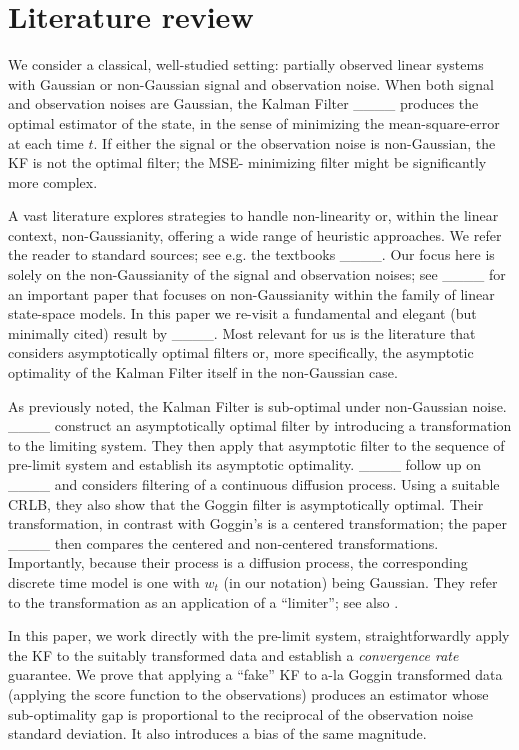 \section{Literature review\label{sec:lit}
} 

We consider a classical, well-studied setting: partially observed linear systems with Gaussian or non-Gaussian signal and observation noise. When both signal and observation noises are Gaussian, the Kalman Filter ____ produces the optimal estimator of the state, in the sense of minimizing the mean-square-error at each time $t$. 
If either the signal or the observation noise is non-Gaussian, the KF is not the optimal filter; the MSE- minimizing filter might be significantly more complex. 

A vast literature explores strategies to handle non-linearity or, within the linear context, non-Gaussianity, offering a wide range of heuristic approaches.
We refer the reader to standard sources; see e.g. the textbooks ____. 
Our focus here is solely on the non-Gaussianity of the signal and observation noises; see 
 ____ for an important paper that focuses on non-Gaussianity within the family of linear state-space models. In this paper we re-visit a fundamental and elegant (but minimally cited) result by  ____. Most relevant for us is the literature that considers asymptotically optimal filters or, more specifically, the asymptotic optimality of the Kalman Filter itself in the non-Gaussian case. 

As previously noted, the Kalman Filter is sub-optimal under non-Gaussian noise. ____ construct an asymptotically optimal filter by introducing a transformation to the limiting system. They then apply that asymptotic filter to the sequence of pre-limit system and establish its asymptotic optimality. ____ follow up on ____ and considers filtering of a continuous diffusion process. Using a suitable CRLB, they also show that the Goggin filter is asymptotically optimal. Their transformation, in contrast with Goggin's is a centered transformation; the paper ____  then compares the centered and non-centered transformations. Importantly, because their process is a diffusion process, the corresponding discrete time model is one with $w_t$ (in our notation) being Gaussian. They refer to the transformation as an application of a ``limiter''; see also \cite[Chatper 20]{Lipster1997}.

 In this paper, we work directly with the pre-limit system, straightforwardly apply the KF to the suitably transformed data and establish a {\em convergence rate} guarantee. We prove that applying a ``fake'' KF to a-la Goggin transformed data (applying the score function to the observations) produces an estimator whose sub-optimality gap is proportional to the reciprocal of the observation noise standard deviation. It also introduces a bias of the same magnitude.  
 
